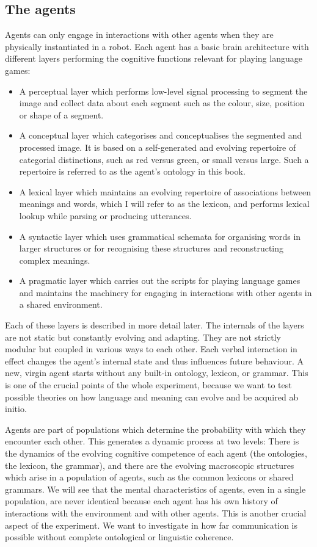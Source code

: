 \subsection{The agents}

Agents can only engage in interactions with other agents 
when they are physically instantiated
in a robot. Each agent has a basic brain architecture
with different layers performing the cognitive functions 
relevant for playing language games: 
\begin{itemize}
\item A perceptual layer which performs low-level signal 
processing to segment the image and collect data about 
each segment such as the colour, size, position or shape
of a segment. 
\item A conceptual layer which categorises and 
conceptualises the segmented and processed image. 
It is based on a self-generated and evolving repertoire
of categorial distinctions, such as red versus green, or
small versus large. Such a repertoire is referred to as 
the agent's ontology in this book. 
\item A lexical layer which maintains an evolving repertoire
of associations between meanings and words, which I will refer to 
as the lexicon, and performs lexical lookup while parsing 
or producing utterances. 
\item A syntactic layer which uses 
grammatical schemata for organising words
in larger structures or for recognising these structures and
reconstructing complex meanings. 
\item A pragmatic layer which carries out the
scripts for playing language games and maintains the machinery 
for engaging in interactions with other agents in a 
shared environment. 
\end{itemize}
Each of these layers is described in more detail 
later. The internals of the layers are not static but
constantly evolving and adapting. They are not strictly 
modular but coupled in various ways to each other.
Each verbal interaction 
in effect changes the agent's internal state and thus 
influences future behaviour. A new, virgin agent 
starts without any built-in ontology, lexicon, or grammar. 
This is one of the crucial points of the whole experiment, 
because we want to test possible theories on how language
and meaning can evolve and be acquired ab initio. 

Agents are part of populations which determine the probability
with which they encounter each other. This generates 
a dynamic process at two levels: There is the dynamics of the evolving
cognitive competence of each agent (the ontologies, 
the lexicon, the grammar), and there are 
the evolving macroscopic structures which arise in a population
of agents, such as the common lexicons or shared grammars. 
We will see that the mental 
characteristics of agents, even in a single population, are never 
identical because each agent has his own history of 
interactions with the environment and with other agents. 
This is another crucial aspect of the experiment. 
We want to investigate in how far communication is possible
without complete ontological or linguistic coherence. 

